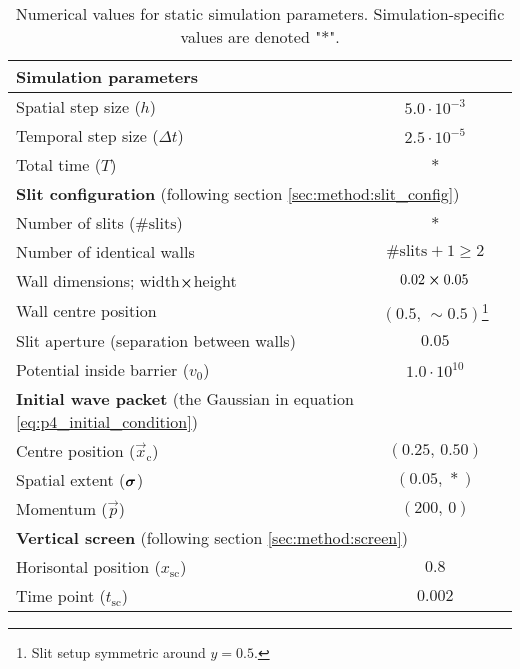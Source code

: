     \begin{table}[ht!]
        \centering
        \begin{tabular}{l|c}
            \hline
            \multicolumn{2}{l}{\textbf{Simulation parameters} \Nanna{??}} \\
            \hline
            Spatial step size ($h$)         & $5.0 \cdot 10^{-3}$   \\
            Temporal step size ($\Delta t$) & $2.5 \cdot 10^{-5}$   \\
            Total time ($T$)                & $*$                   \\
            \hline
            \multicolumn{2}{l}{\textbf{Slit configuration} (following section \ref{sec:method:slit_config})} \\
            \hline
            Number of slits ($\#\mathrm{slits}$)    & $*$                           \\
            Number of identical walls               & $\#\mathrm{slits} + 1 \geq 2$ \\
            Wall dimensions; width$\cross$height    & $0.02\cross 0.05$             \\
            Wall centre position                    & $(0.5,\, \sim\!0.5)$\footnote{Slit setup symmetric around $y=0.5$.}   \\
            Slit aperture (separation between walls)& $0.05$                        \\
            Potential inside barrier ($v_0$)        & $1.0\cdot 10^{10}$            \\
            \hline
            \multicolumn{2}{l}{\textbf{Initial wave packet} (the Gaussian in equation \eqref{eq:p4_initial_condition})} \\
            \hline
            Centre position ($\vec{x}_\mathrm{c}$)  & $(0.25,\,0.50)$           \\
            Spatial extent ($\boldsymbol{\sigma}$)        & $(0.05, \,*)$             \\
            Momentum ($\vec{p}$)                    & $(200,\, 0)$              \\
            \hline
            \multicolumn{2}{l}{\textbf{Vertical screen} (following section \ref{sec:method:screen})} \\
            \hline
            Horisontal position ($x_\mathrm{sc}$)   & $0.8$     \\
            Time point ($t_\mathrm{sc}$)            & $0.002$   \\
            \hline
        \end{tabular}
        \caption{Numerical values for static simulation parameters. Simulation-specific values are denoted "$*$".}
        \label{tab:simulation_parameters}
    \end{table}



